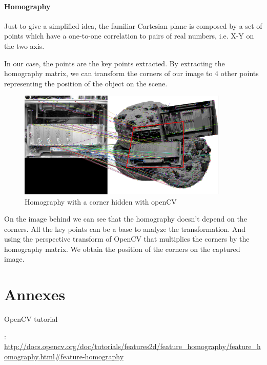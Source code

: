 \documentclass[english,a4paper,11pt]{report}
\begin{document}
	
	\subsubsection{Homography}
	\par  Just to give a simplified idea, the familiar Cartesian plane is composed by a set of points which have a one-to-one correlation to pairs of real numbers, i.e. X-Y on the two axis\cite{Homography}.
	\par In our case, the points are the key points extracted. By extracting the homography matrix, we can transform the corners of our image to 4 other points representing the position of the object on the scene\cite{TutoHomography}.
	
	\begin{figure}
			\includegraphics[width=10cm]{images_not_compressed/showHomography.png}
			\caption{Homography with a corner hidden with openCV}
	\end{figure}
	\par On the image behind we can see that the homography doesn't depend on the corners. All the key points can be a base to analyze the transformation. And using the perspective transform of OpenCV that multiplies the corners by the homography matrix. We obtain the position of the corners on the captured image.

	
	

	\clearpage

	{}
	

	\chapter{Annexes}
	\hypertarget{opencv}{OpenCV tutorial} : 	\url{http://docs.opencv.org/doc/tutorials/features2d/feature_homography/feature_homography.html#feature-homography}


	\listoffigures
		
	
	
	
	

	
	
	
\end{document}
